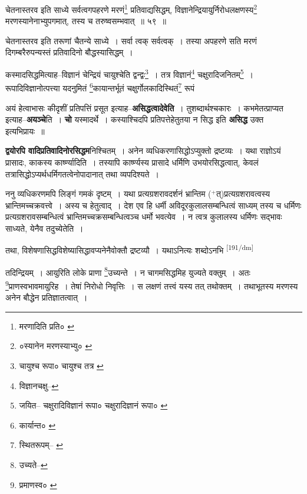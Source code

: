 \documentclass[article,12pt,a4paper]{memoir}
\newcommand{\add}[1]{($^{+}$#1)}
\begin{document}
	  \pstart चेतनास्तरव इति साध्ये सर्वत्वगपहरणे मरणं\footnote{मरणादिति प्रति० \cite{dp-msC}} प्रतिवाद्यसिद्धम्, विज्ञानेन्द्रियायुर्निरोधलक्षणस्य\footnote{०स्यानेन मरणस्याभ्यु० \cite{dp-msC}} मरणस्यानेनाभ्युपगमात्, तस्य च तरुष्वसम्भवात् ॥ ५९ ॥
	\pend
       

	  \pstart चेतनास्तरव इति तरूणां चैतन्ये साध्ये । सर्वा त्वक् सर्वत्वक् । तस्या अपहरणे सति मरणं दिगम्बरैरुपन्यस्तं प्रतिवादिनो बौद्धस्यासिद्धम् ।
	\pend
       

	  \pstart कस्मादसिद्धमित्याह--विज्ञानं चेन्द्रियं चायुश्चेति द्वन्द्वः\footnote{चायुश्च रूपा० \cite{dp-msA} \cite{dp-edP} \cite{dp-edH} चायुश्च तत्र \cite{dp-msB} \cite{dp-edN}} । तत्र विज्ञानं\footnote{विज्ञानचक्षु--\cite{dp-msB}} चक्षुरादिजनितम्\footnote{जयित--\cite{dp-msB} चक्षुरादिविज्ञानं रूपा० \cite{dp-edE} चक्षुरादिज्ञानं रूपा० \cite{dp-msC}} । रूपादिविज्ञानोत्पत्त्या यदनुमितं \footnote{कार्यान्त० \cite{dp-msB} \cite{dp-edP}}कायान्तर्भूतं चक्षुर्गोलकादिस्थितं\footnote{स्थितरूपम्--\cite{dp-msA} \cite{dp-msB} \cite{dp-edP} \cite{dp-edH} \cite{dp-edN}} रूपं
	\pend
      

	  \pstart अयं हेत्वाभासः कीदृशीं प्रतिपत्तिं प्रसूत इत्याह--\textbf{असिद्धत्वादेवेति} । तुशब्दार्थश्चकारः । कभमेतत्प्राप्यत इत्याह--\textbf{अयञ्चे}ति । \textbf{चो} यस्मादर्थे । कस्याश्चिदपि प्रतिपत्तेहेतुतया न सिद्ध इति \textbf{असिद्ध} उक्त इत्यभिप्रायः ॥
	\pend
      

	  \pstart \textbf{द्वयोरपि वादिप्रतिवादिनोरसिद्धम}निश्चितम् । अनेन व्यधिकरणासिद्धोऽप्युक्तो द्रष्टव्यः । यथा राज्ञोऽयं प्रासादः, काकस्य कार्ष्ण्यादिति । तस्यापि कार्ष्ण्यस्य प्रासादे धर्मिणि उभयोरसिद्धत्वात्, केवलं तत्रासिद्धोऽप्यर्थधर्मिगतत्वेनोपादानात् तथा व्यपदिश्यते ।
	\pend
      

	  \pstart ननु व्यधिकरणमपि लिङ्गं गमकं दृष्टम् । यथा प्रत्यग्रशरावदर्शनं भ्रान्तिम \add{त्}प्रत्यग्रशरावत्वस्य भ्रान्तिमच्चक्रवत्त्वे । अस्य च हेतुत्वाद् । देश एव हि धर्मी अविदूरकुलालसम्बन्धित्वं साध्यम् तस्य च धर्मिणः प्रत्यग्रशरावसम्बन्धित्वं भ्रान्तिमच्चक्रसम्बन्धित्वञ्च धर्मो भवत्येव । न त्वत्र कुलालस्य धर्मिणः सद्भावः साध्यते, येनैव तदुच्येतेति ।
	\pend
      

	  \pstart तथा, विशेषणासिद्धविशेष्यासिद्धावप्यनेनैवोक्तौ द्रष्टव्यौ । यथाऽनित्यः शब्दोऽनभि \leavevmode\textsuperscript{\rmlatinfont\tiny [191/dm]} 
	  
	तदिन्द्रियम् । आयुरिति लोके प्राणा \footnote{उच्यते--\cite{dp-msB}}उच्यन्ते । न चागमसिद्धमिह युज्यते वक्तुम् । अतः \footnote{प्रमाणस्व० \cite{dp-edH}}प्राणस्वभावमायुरिह । तेषां निरोधो निवृत्तिः । स लक्षणं तत्त्वं यस्य तत् तथोक्तम् । तथाभूतस्य मरणस्य अनेन बौद्धेन प्रतिज्ञातत्वात् । 
	  
\end{document}
